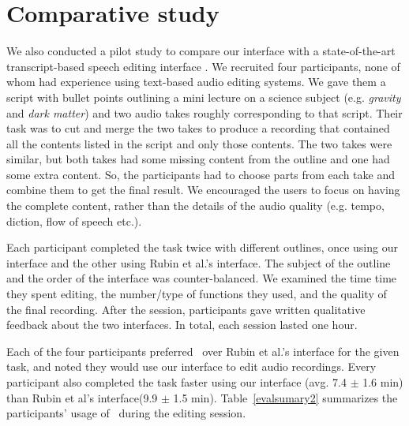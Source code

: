 \section{Comparative study}
We also conducted a pilot study to compare our interface with
a state-of-the-art transcript-based speech editing interface
\cite{rubin2013content}.  We recruited four participants, none of whom had
experience using text-based audio editing systems. We gave them
a script with bullet points outlining a mini lecture on a science
subject (e.g. \textit{gravity} and \textit{dark matter}) and
two audio takes roughly corresponding to that script. Their task
was to cut and merge the two takes to produce a recording that
contained all the contents listed in the script and only those
contents. The two takes were similar, but both takes had some
missing content from the outline and one had some extra
content. So, the participants had to choose parts from each take
and combine them to get the final result. We encouraged the users
to focus on having the complete content, rather than the details
of the audio quality (e.g. tempo, diction, flow of speech etc.).


Each participant completed the task twice with different outlines,
once using our interface and the other using Rubin et al.'s interface.
The subject of the outline and the order of the interface was
counter-balanced. We examined the time time they spent editing,
the number/type of functions they used, and the quality of the
final recording. After the session, participants gave written
qualitative feedback about the two interfaces. In total, each
session lasted one hour.
   
Each of the four participants preferred \systemname\ over Rubin
et al.'s interface for the given task, and noted they would use
our interface to edit audio recordings. Every participant also
completed the task faster using our interface (avg. 7.4 $\pm$
1.6 min) than Rubin et al's interface(9.9 $\pm$ 1.5 min). Table~\ref{evalsumary2}
summarizes the participants' usage of \systemname\ during the
editing session.


